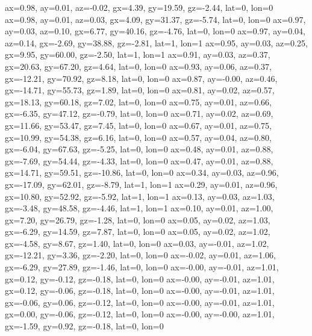 ax=0.98, ay=0.01, az=-0.02, gx=4.39, gy=19.59, gz=-2.44, lat=0, lon=0
ax=0.98, ay=0.01, az=0.03, gx=4.09, gy=31.37, gz=-5.74, lat=0, lon=0
ax=0.97, ay=0.03, az=0.10, gx=6.77, gy=40.16, gz=-4.76, lat=0, lon=0
ax=0.97, ay=0.04, az=0.14, gx=-2.69, gy=38.88, gz=-2.81, lat=1, lon=1
ax=0.95, ay=0.03, az=0.25, gx=9.95, gy=60.00, gz=-2.50, lat=1, lon=1
ax=0.91, ay=0.03, az=0.37, gx=20.63, gy=67.20, gz=4.64, lat=0, lon=0
ax=0.93, ay=0.06, az=0.37, gx=-12.21, gy=70.92, gz=8.18, lat=0, lon=0
ax=0.87, ay=-0.00, az=0.46, gx=-14.71, gy=55.73, gz=1.89, lat=0, lon=0
ax=0.81, ay=0.02, az=0.57, gx=18.13, gy=60.18, gz=7.02, lat=0, lon=0
ax=0.75, ay=0.01, az=0.66, gx=-6.35, gy=47.12, gz=-0.79, lat=0, lon=0
ax=0.71, ay=0.02, az=0.69, gx=11.66, gy=53.47, gz=7.45, lat=0, lon=0
ax=0.67, ay=0.01, az=0.75, gx=10.99, gy=54.38, gz=6.16, lat=0, lon=0
ax=0.57, ay=0.04, az=0.80, gx=-6.04, gy=67.63, gz=-5.25, lat=0, lon=0
ax=0.48, ay=0.01, az=0.88, gx=-7.69, gy=54.44, gz=-4.33, lat=0, lon=0
ax=0.47, ay=0.01, az=0.88, gx=14.71, gy=59.51, gz=-10.86, lat=0, lon=0
ax=0.34, ay=0.03, az=0.96, gx=-17.09, gy=62.01, gz=-8.79, lat=1, lon=1
ax=0.29, ay=0.01, az=0.96, gx=10.80, gy=52.92, gz=-5.92, lat=1, lon=1
ax=0.13, ay=0.03, az=1.03, gx=-3.48, gy=48.58, gz=-4.46, lat=1, lon=1
ax=0.10, ay=0.01, az=1.00, gx=7.20, gy=26.79, gz=-1.28, lat=0, lon=0
ax=0.05, ay=0.02, az=1.03, gx=-6.29, gy=14.59, gz=7.87, lat=0, lon=0
ax=0.05, ay=0.02, az=1.02, gx=-4.58, gy=8.67, gz=1.40, lat=0, lon=0
ax=0.03, ay=-0.01, az=1.02, gx=-12.21, gy=3.36, gz=-2.20, lat=0, lon=0
ax=-0.02, ay=0.01, az=1.06, gx=-6.29, gy=27.89, gz=-1.46, lat=0, lon=0
ax=-0.00, ay=-0.01, az=1.01, gx=0.12, gy=-0.12, gz=-0.18, lat=0, lon=0
ax=-0.00, ay=-0.01, az=1.01, gx=0.12, gy=-0.06, gz=-0.18, lat=0, lon=0
ax=-0.00, ay=-0.01, az=1.01, gx=-0.06, gy=0.06, gz=-0.12, lat=0, lon=0
ax=-0.00, ay=-0.01, az=1.01, gx=0.00, gy=-0.06, gz=-0.12, lat=0, lon=0
ax=-0.00, ay=-0.00, az=1.01, gx=-1.59, gy=0.92, gz=-0.18, lat=0, lon=0
